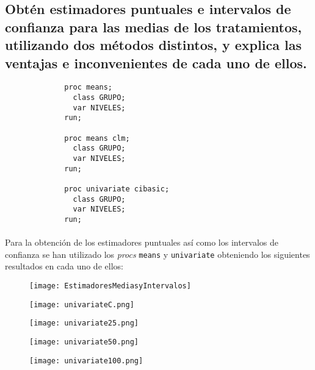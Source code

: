\documentclass{article}
\begin{document}
    \subsection{Obtén estimadores puntuales e intervalos de confianza para las medias de los tratamientos, utilizando dos métodos distintos, y explica las ventajas e inconvenientes de cada uno de ellos.}

    \begin{figure}[h]
      \centering
      \begin{verbatim}
        proc means;
          class GRUPO;
          var NIVELES;
        run;

        proc means clm;
          class GRUPO;
          var NIVELES;
        run;

        proc univariate cibasic;
          class GRUPO;
          var NIVELES;
        run;
      \end{verbatim}
      \label{code:sas_4}
    \end{figure}

      \paragraph{}
      Para la obtención de los estimadores puntuales así como los intervalos de confianza se han utilizado los \emph{procs} \texttt{means} y \texttt{univariate} obteniendo los siguientes resultados en cada uno de ellos:

      \begin{figure}[H]
        \centering
        \texttt{[image: EstimadoresMediasyIntervalos]}
      \end{figure}

      \begin{figure}[H]
        \centering
        \texttt{[image: univariateC.png]}
      \end{figure}

      \begin{figure}[H]
        \centering
        \texttt{[image: univariate25.png]}
      \end{figure}

      \begin{figure}[H]
        \centering
        \texttt{[image: univariate50.png]}
      \end{figure}

      \begin{figure}[H]
        \centering
        \texttt{[image: univariate100.png]}
      \end{figure}
\end{document}
